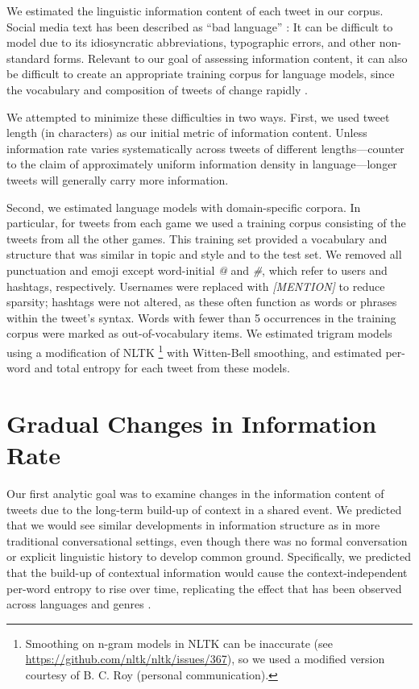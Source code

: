 \documentclass[11pt,letterpaper]{article}
\begin{document}
We estimated the linguistic information content of each tweet in our corpus. Social media text has been described as ``bad language'' \cite{eisenstein2013}: It can be difficult to model due to its idiosyncratic abbreviations, typographic errors, and other non-standard forms. Relevant to our goal of assessing information content, it can also be difficult to create an appropriate training corpus for language models, since the vocabulary and composition of tweets of change rapidly \cite{eisenstein2013}.

We attempted to minimize these difficulties in two ways.  First, we used tweet length (in characters) as our initial metric of information content. Unless information rate varies systematically across tweets of different lengths---counter to the claim of approximately uniform information density in language\cite{genzel2002,levy2007}---longer tweets will generally carry more information.

Second, we estimated language models with domain-specific corpora. In particular, for tweets from each game we used a training corpus consisting of the tweets from all the other games. This training set provided a vocabulary and structure that was similar in topic and style and to the test set.  We removed all punctuation and emoji except word-initial {\it @} and {\it \#}, which refer to users and hashtags, respectively.  Usernames were replaced with {\it [MENTION]} to reduce sparsity; hashtags were not altered, as these often function as words or phrases within the tweet's syntax.  Words with fewer than 5 occurrences in the training corpus were marked as out-of-vocabulary items. We estimated trigram models using a modification of NLTK \cite{bird2006}\footnote{Smoothing on n-gram models in NLTK can be inaccurate (see \url{https://github.com/nltk/nltk/issues/367}), so we used a modified version courtesy of B. C. Roy (personal communication).} with Witten-Bell smoothing, and estimated per-word and total entropy for each tweet from these models.

\section{Gradual Changes in Information Rate}

Our first analytic goal was to examine changes in the information content of tweets due to the long-term build-up of context in a shared event.  We predicted that we would see similar developments in information structure as in more traditional conversational settings, even though there was no formal conversation or explicit linguistic history to develop common ground.  Specifically, we predicted that the build-up of contextual information would cause the context-independent per-word entropy to rise over time, replicating the effect that has been observed across languages and genres \cite{genzel2002,genzel2003,qian2012}.
\end{document}
